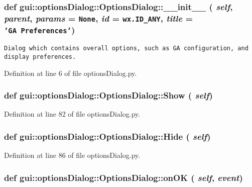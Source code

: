 \subsubsection{\setlength{\rightskip}{0pt plus 5cm}def gui::optionsDialog::OptionsDialog::\_\-\_\-init\_\-\_\- ( {\em self},  {\em parent},  {\em params} = {\tt None},  {\em id} = {\tt wx.ID\_\-ANY},  {\em title} = {\tt 'GA~Preferences'})}\label{classgui_1_1optionsDialog_1_1OptionsDialog_0886586ef8a13f1e2bda734fcc9e0ee7}




\footnotesize\begin{verbatim}
Dialog which contains overall options, such as GA configuration, and display preferences.
\end{verbatim}
\normalsize
 

Definition at line 6 of file optionsDialog.py.
\subsubsection{\setlength{\rightskip}{0pt plus 5cm}def gui::optionsDialog::OptionsDialog::Show ( {\em self})}\label{classgui_1_1optionsDialog_1_1OptionsDialog_3bacc7abfeca45640ab744dbb25feb19}




Definition at line 82 of file optionsDialog.py.
\subsubsection{\setlength{\rightskip}{0pt plus 5cm}def gui::optionsDialog::OptionsDialog::Hide ( {\em self})}\label{classgui_1_1optionsDialog_1_1OptionsDialog_75a36576e681cec898f8e219a1edab28}




Definition at line 86 of file optionsDialog.py.
\subsubsection{\setlength{\rightskip}{0pt plus 5cm}def gui::optionsDialog::OptionsDialog::onOK ( {\em self},  {\em event})}\label{classgui_1_1optionsDialog_1_1OptionsDialog_bc573df819be3ba0808c5bfda45f571b}





